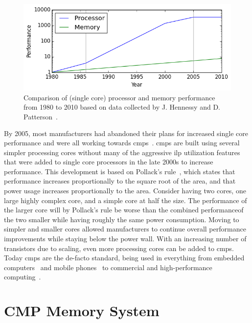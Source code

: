 \begin{figure}[ht]
\centering
\includegraphics[width=.8\textwidth]{figures/introduction/memory-gap}
\caption[Processor-Memory Gap]{Comparison of (single core) processor and memory performance from 1980 to 2010 based on data collected by J. Hennessy and D. Patterson~\cite{hennessy2012}.}
\label{fig:introduction:memgap}
\end{figure}

By 2005, most manufacturers had abandoned their plans for increased single core performance and were all working towards \glspl{cmp}~\cite{Sutter2005}.
\glspl{cmp} are built using several simpler processing cores without many of the aggressive \gls{ilp} utilization features that were added to single core processors in the late 2000s to increase performance.
This development is based on Pollack's rule~\cite{Borkar2007}, which states that performance increases proportionally to the square root of the area, and that power usage increases proportionally to the area.
Consider having two cores, one large highly complex core, and a simple core at half the size.
The performance of the larger core will by Pollack's rule be worse than the combined performance\footnotemark of the two smaller while having roughly the same power consumption.
Moving to simpler and smaller cores allowed manufacturers to continue overall performance improvements while staying below the power wall.
With an increasing number of transistors due to scaling, even more processing cores can be added to \glspl{cmp}.
Today \glspl{cmp} are the de-facto standard, being used in everything from embedded computers~\cite{ARM2010} and mobile phones~\cite{Ho2014} to commercial and high-performance computing~\cite{Thomadakis2011, Jain2013}.


\section{CMP Memory System}

